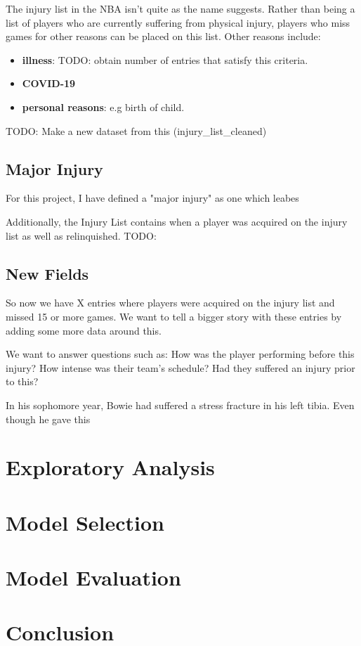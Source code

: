 \documentclass{article}
\begin{document}
The injury list in the NBA isn't quite as the name suggests. Rather than being a list
of players who are currently suffering from physical injury, players who miss games
for other reasons can be placed on this list. Other reasons include:

\begin{itemize}
    \item \textbf{illness}: TODO: obtain number of entries that satisfy this criteria.
    \item \textbf{COVID-19}
    \item \textbf{personal reasons}: e.g birth of child.
\end{itemize}

TODO: Make a new dataset from this (injury\_list\_cleaned)

\subsection*{Major Injury}

For this project, I have defined a "major injury" as one which leabes

Additionally, the Injury List contains when a player was acquired on the injury list
as well as relinquished. TODO:

\subsection*{New Fields}

So now we have X entries where players were acquired on the injury list
and missed 15 or more games.
We want to tell a bigger story with these entries by adding some more data 
around this. 

We want to answer questions such as: How was the player performing before this injury? How intense
was their team's schedule? Had they suffered an injury prior to this?



In his sophomore year, Bowie had suffered a stress fracture in his left tibia. Even though he gave this 

\newpage
\section*{Exploratory Analysis}



\section*{Model Selection}

\section*{Model Evaluation}

\section*{Conclusion}
\end{document}
